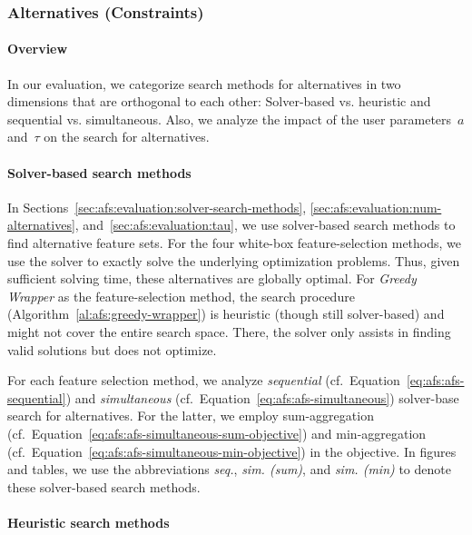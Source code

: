 \documentclass{article}
\theoremstyle{definition}
\begin{document}
\subsubsection{Alternatives (Constraints)}
\label{sec:afs:experimental-design:approaches:alternatives}

\paragraph{Overview}

In our evaluation, we categorize search methods for alternatives in two dimensions that are orthogonal to each other:
Solver-based vs. heuristic and sequential vs. simultaneous.
Also, we analyze the impact of the user parameters~$a$ and~$\tau$ on the search for alternatives.

\paragraph{Solver-based search methods}

In Sections~\ref{sec:afs:evaluation:solver-search-methods}, \ref{sec:afs:evaluation:num-alternatives}, and~\ref{sec:afs:evaluation:tau}, we use solver-based search methods to find alternative feature sets.
For the four white-box feature-selection methods, we use the solver to exactly solve the underlying optimization problems.
Thus, given sufficient solving time, these alternatives are globally optimal.
For \emph{Greedy Wrapper} as the feature-selection method, the search procedure (Algorithm~\ref{al:afs:greedy-wrapper}) is heuristic (though still solver-based) and might not cover the entire search space.
There, the solver only assists in finding valid solutions but does not optimize.

For each feature selection method, we analyze \emph{sequential} (cf.~Equation~\ref{eq:afs:afs-sequential}) and \emph{simultaneous} (cf.~Equation~\ref{eq:afs:afs-simultaneous}) solver-base search for alternatives.
For the latter, we employ sum-aggregation (cf.~Equation~\ref{eq:afs:afs-simultaneous-sum-objective}) and min-aggregation (cf.~Equation~\ref{eq:afs:afs-simultaneous-min-objective}) in the objective.
In figures and tables, we use the abbreviations \emph{seq.}, \emph{sim. (sum)}, and \emph{sim. (min)} to denote these solver-based search methods.

\paragraph{Heuristic search methods}
\end{document}
